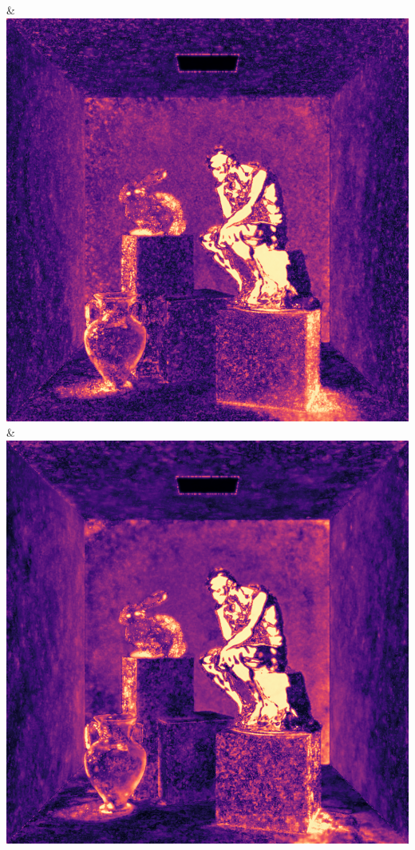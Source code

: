 & \includegraphics[width=\linewidth]{figures/py/tests/quality_comparison/nrc+sppc+Rej70+RejN_1spp_thinker_flip.png}
& \includegraphics[width=\linewidth]{figures/py/tests/quality_comparison/nrc+sppc14@1_1spp_thinker_flip.png}

